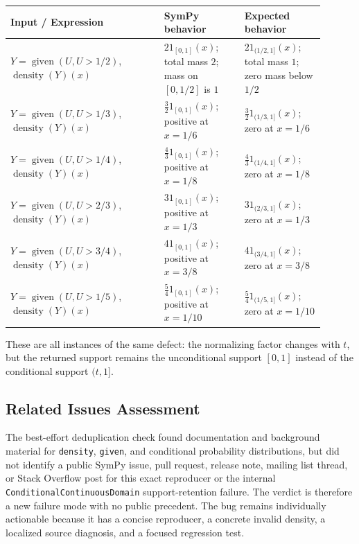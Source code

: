 \documentclass[11pt]{article}
\begin{document}
\begin{center}
\scriptsize
\renewcommand{\arraystretch}{1.3}
\begin{tabular}{@{}>{\raggedright\arraybackslash}p{0.44\linewidth}>{\raggedright\arraybackslash}p{0.23\linewidth}>{\raggedright\arraybackslash}p{0.23\linewidth}@{}}
\toprule
\textbf{Input / Expression} & \textbf{SymPy behavior} & \textbf{Expected behavior} \\
\midrule
\(Y=\operatorname{given}(U,U>1/2)\), \(\operatorname{density}(Y)(x)\)
& \(2\mathrm{1}_{[0,1]}(x)\); total mass \(2\); mass on \([0,1/2]\) is \(1\)
& \(2\mathrm{1}_{(1/2,1]}(x)\); total mass \(1\); zero mass below \(1/2\) \\
\(Y=\operatorname{given}(U,U>1/3)\), \(\operatorname{density}(Y)(x)\)
& \(\frac{3}{2}\mathrm{1}_{[0,1]}(x)\); positive at \(x=1/6\)
& \(\frac{3}{2}\mathrm{1}_{(1/3,1]}(x)\); zero at \(x=1/6\) \\
\(Y=\operatorname{given}(U,U>1/4)\), \(\operatorname{density}(Y)(x)\)
& \(\frac{4}{3}\mathrm{1}_{[0,1]}(x)\); positive at \(x=1/8\)
& \(\frac{4}{3}\mathrm{1}_{(1/4,1]}(x)\); zero at \(x=1/8\) \\
\(Y=\operatorname{given}(U,U>2/3)\), \(\operatorname{density}(Y)(x)\)
& \(3\mathrm{1}_{[0,1]}(x)\); positive at \(x=1/3\)
& \(3\mathrm{1}_{(2/3,1]}(x)\); zero at \(x=1/3\) \\
\(Y=\operatorname{given}(U,U>3/4)\), \(\operatorname{density}(Y)(x)\)
& \(4\mathrm{1}_{[0,1]}(x)\); positive at \(x=3/8\)
& \(4\mathrm{1}_{(3/4,1]}(x)\); zero at \(x=3/8\) \\
\(Y=\operatorname{given}(U,U>1/5)\), \(\operatorname{density}(Y)(x)\)
& \(\frac{5}{4}\mathrm{1}_{[0,1]}(x)\); positive at \(x=1/10\)
& \(\frac{5}{4}\mathrm{1}_{(1/5,1]}(x)\); zero at \(x=1/10\) \\
\bottomrule
\end{tabular}
\end{center}

These are all instances of the same defect: the normalizing factor changes with
\(t\), but the returned support remains the unconditional support \([0,1]\)
instead of the conditional support \((t,1]\).

\subsection{Related Issues Assessment}

The best-effort deduplication check found documentation and background material
for \texttt{density}, \texttt{given}, and conditional probability distributions,
but did not identify a public SymPy issue, pull request, release note, mailing
list thread, or Stack Overflow post for this exact reproducer or the internal
\texttt{ConditionalContinuousDomain} support-retention failure.  The verdict is
therefore a new failure mode with no public precedent.  The bug remains
individually actionable because it has a concise reproducer, a concrete invalid
density, a localized source diagnosis, and a focused regression test.
\end{document}
